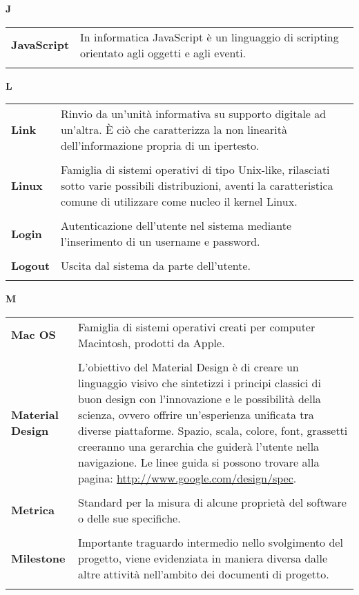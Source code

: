 \newpage 
{} 
{} 
\hfill\Huge{\textbf{J}} \\ 
\normalsize 
\begin{longtable}{L{4cm} p{10cm}}
\textbf{JavaScript} & In informatica JavaScript è un linguaggio di scripting orientato agli oggetti e agli eventi. \\ 
 \\ 
\end{longtable} 
\newpage 
{} 
{} 
\hfill\Huge{\textbf{L}} \\ 
\normalsize 
\begin{longtable}{L{4cm} p{10cm}}
\textbf{Link} & Rinvio da un'unità informativa su supporto digitale ad un'altra. È ciò che caratterizza la non linearità dell'informazione propria di un ipertesto. \\ 
 \\ 
\textbf{Linux} & Famiglia di sistemi operativi di tipo Unix-like, rilasciati sotto varie possibili distribuzioni, aventi la caratteristica comune di utilizzare come nucleo il kernel Linux. \\ 
 \\ 
\textbf{Login} & Autenticazione dell’utente nel sistema mediante l’inserimento di un username e password. \\ 
 \\ 
\textbf{Logout} & Uscita dal sistema da parte dell’utente. \\ 
 \\ 
\end{longtable} 
\newpage 
{} 
{} 
\hfill\Huge{\textbf{M}} \\ 
\normalsize 
\begin{longtable}{L{4cm} p{10cm}}
\textbf{Mac OS} & Famiglia di sistemi operativi creati per computer Macintosh, prodotti da Apple. \\ 
 \\ 
\textbf{Material Design} & L’obiettivo del Material Design è di creare un linguaggio visivo che sintetizzi i principi classici di buon design con l’innovazione e le possibilità della scienza, ovvero offrire un’esperienza unificata tra diverse piattaforme. Spazio, scala, colore, font, grassetti creeranno una gerarchia che guiderà l’utente nella navigazione. Le linee guida si possono trovare alla pagina: \url{http://www.google.com/design/spec}. \\ 
 \\ 
\textbf{Metrica} & Standard per la misura di alcune proprietà del software o delle sue specifiche. \\ 
 \\ 
\textbf{Milestone} & Importante traguardo intermedio nello svolgimento del progetto, viene evidenziata in maniera diversa dalle altre attività nell'ambito dei documenti di progetto. \\ 
 \\ 
\end{longtable} 
